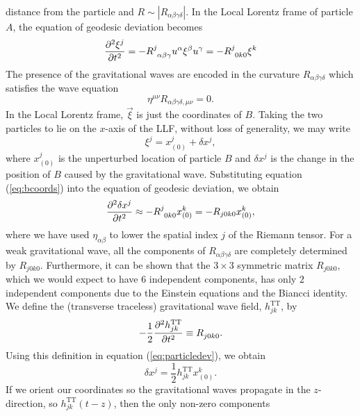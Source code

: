 distance from the particle and $R \sim |R_{\alpha\beta\gamma\delta}|$. In the
Local Lorentz frame of particle $A$, the equation of geodesic deviation
becomes
\begin{equation}
\frac{\partial^2 \xi^{j}}{\partial t^2} = -
\tensor{R}{^j_{\alpha\beta\gamma}}u^\alpha\xi^\beta u^\gamma =
-\tensor{R}{^j_{0k0}} \xi^k
\end{equation}
The presence of the gravitational waves are encoded in the curvature
$R_{\alpha\beta\gamma\delta}$ which satisfies the wave equation
\begin{equation}
\eta^{\mu\nu}R_{\alpha\beta\gamma\delta,\mu\nu} = 0.
\end{equation}
In the Local Lorentz frame, $\vec{\xi}$ is just the coordinates of $B$.
Taking the two particles to lie on the $x$-axis of the LLF, without loss of
generality, we may write
\begin{equation}
\label{eq:bcoords}
\xi^j = x_{(0)}^j + \delta x^j,
\end{equation}
where $x_{(0)}^j$ is the unperturbed location of particle $B$ and $\delta x^j$
is the change in the position of $B$ caused by the gravitational wave.
Substituting equation (\ref{eq:bcoords}) into the equation of geodesic
deviation, we obtain
\begin{equation}
\label{eq:particledev}
\frac{\partial^2 \delta x^j}{\partial t^2} \approx - \tensor{R}{^j_{0k0}} x_{(0)}^k =
-R_{j0k0} x_{(0)}^k,
\end{equation}
where we have used $\eta_{\alpha\beta}$ to lower the spatial index $j$ of the
Riemann tensor. For a weak gravitational wave, all the components of
$R_{\alpha\beta\gamma\delta}$ are completely determined by $R_{j0k0}$.
Furthermore, it can be shown that the $3\times3$ symmetric matrix $R_{j0k0}$,
which we would expect to have $6$ independent components, has only $2$
independent components due to the Einstein equations and the Biancci identity.
We define the (transverse traceless) gravitational wave field,
$h_{jk}^\mathrm{TT}$, by
\begin{equation}
-\frac{1}{2} \frac{\partial^2 h_{jk}^\mathrm{TT}}{\partial t^2} \equiv
\tensor{R}{_{j0k0}}.
\label{eq:hjkdef}
\end{equation}
Using this definition in equation (\ref{eq:particledev}), we obtain
\begin{equation}
\delta x^j = \frac{1}{2} h_{jk}^\mathrm{TT} x_{(0)}^k.
\end{equation}
If we orient our coordinates so the gravitational waves propagate in the
$z$-direction, so $h_{jk}^\mathrm{TT}(t-z)$, then the only non-zero components
